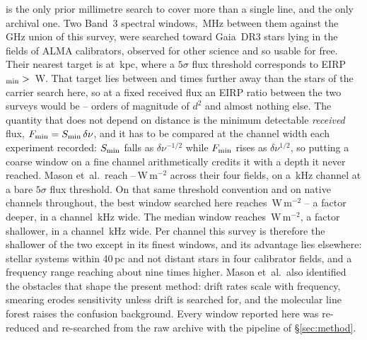 \citet{Mason2025} is the only prior millimetre search to cover more than a
single line, and the only archival one. Two Band~3 spectral windows, \MasonBandMHz\,MHz between them against the
\CvUnionA\,GHz union of this survey, were searched toward
\MasonNStar{} Gaia~DR3 stars lying in the fields of \MasonNCal{} ALMA
calibrators, observed for other science and so usable for free. Their
nearest target is at \MasonNearKpc\,kpc, where a $5\sigma$ flux threshold
corresponds to EIRP$_{\rm min}>{}$\MasonNearEirp\,W. That target lies
between \MasonDistRatioFar{} and \MasonDistRatioNear{} times further away
than the stars of the carrier search here, so at a fixed received flux an
EIRP ratio between the two surveys would be
\MasonEirpOrdLo--\MasonEirpOrdHi{} orders of magnitude of $d^{2}$ and
almost nothing else. The quantity
that does not depend on distance is the minimum detectable \emph{received}
flux, $F_{\rm min}=S_{\rm min}\,\delta\nu$, and it has to be compared at
the channel width each experiment recorded: $S_{\rm min}$ falls as
$\delta\nu^{-1/2}$ while $F_{\rm min}$ rises as $\delta\nu^{1/2}$, so
putting a coarse window on a fine channel arithmetically credits it with a
depth it never reached. Mason
et~al.\ reach \MasonFluxLo--\MasonFluxHi\,W\,m$^{-2}$ across their four
fields, on a \MasonChanKHz\,kHz channel at a bare $5\sigma$ flux
threshold. On that same threshold convention and on native channels throughout, the
best window searched here reaches \FluxTrigBest\,W\,m$^{-2}$ -- a factor
\FluxNatBestRatio{} deeper, in a channel \FluxChanBestKHz\,kHz wide. The
median window reaches \FluxTrigMed\,W\,m$^{-2}$, a factor
\FluxNatMedRatio{} shallower, in a channel \FluxChanMedKHz\,kHz wide. Per channel this survey is therefore the
shallower of the two except in its finest windows, and its advantage lies
elsewhere: \NSysClassA{} stellar systems within 40\,pc and not distant
stars in four calibrator fields, and a frequency range reaching about nine
times higher. Mason et~al.\ also
identified the obstacles that shape the present method: drift rates scale
with frequency, smearing erodes sensitivity unless drift is searched for,
and the molecular line forest raises the confusion background. Every
window reported here was re-reduced and re-searched from the raw archive
with the pipeline of \S\ref{sec:method}.

